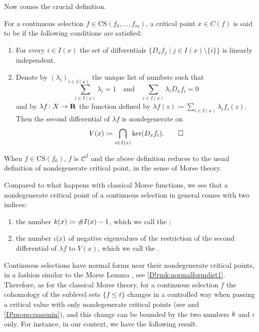 Now comes the crucial definition. 

\begin{definition}
\label{D!def:nondegintro}
  For a continuous selection $f \in \mathrm{CS}(f_0, \ldots, f_m)$, a critical point $x \in C(f)$ is said to be  if the following conditions are satisfied:
  \begin{enumerate}[label=(\roman*)]
    \item \label{D!eq:indexset} For every $i\in I(x)$ the set of differentials $\{D_x f_j \mid j\in I(x)\setminus \{i\}\}$ is linearly independent.
    \item Denote by $(\lambda_i)_{i\in I(x)}$ the unique list of  numbers such that 
    \[
      \sum_{i \in I(x)} \lambda_i = 1
      \quad \textrm{and} \quad
      \sum_{i \in I(x)} \lambda_i D_x f_i = 0
    \]
    and by $\lambda f \colon X\to \mathbf{R}$ the function defined by $\lambda f(z) \coloneq \sum_{i\in I(x)} \lambda_i f_i(z).$ Then the second differential of $\lambda f$ is nondegenerate on 
    \[
      V(x) \coloneq \bigcap_{i\in I(x)} \ker(D_x f_i).
      \qedhere
    \]
  \end{enumerate}
\end{definition}

When $f\in \mathrm{CS}(f_0)$, $f$ is $\mathcal{C}^2$ and the above definition reduces to the usual definition of nondegenerate critical point, in the sense of Morse theory. 

Compared to what happens with classical Morse functions, we see that a nondegenerate critical point of a continuous selection in general comes with two indices:
\begin{enumerate}
  \item[-] the number $k(x) \coloneq \#I(x) - 1$, which we call the ;
  \item[-] the number $\iota(x)$ of negative eigenvalues of the restriction of the second differential of $\lambda f$ to $V(x)$, which we call the .
\end{enumerate} 
Continuous selections have normal forms near their nondegenerate critical points, in a fashion similar to the Morse Lemma \cite[Lemma~2.2]{Milnor1963}, see \cref{D!rmk:normalformdist1}. Therefore, as for the classical Morse theory, for a continuous selection $f$ the cohomology of the sublevel sets $\{f \leq t\}$ changes in a controlled way when passing a critical value with only nondegenerate critical points (see \cite{APS1997} and \cref{D!propo:passmin}), and this change can be bounded by the two numbers $k$ and $\iota$ only. For instance, in our context, we have the following result.

